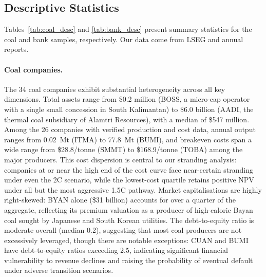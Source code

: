 \subsection{Descriptive Statistics}
\label{subsec:descriptive_stats}

Tables~\ref{tab:coal_desc} and \ref{tab:bank_desc} present summary statistics for the coal and bank samples, respectively. Our data come from LSEG and annual reports.




\paragraph{Coal companies.} The 34 coal companies exhibit substantial heterogeneity across all key dimensions. Total assets range from \$0.2 million (BOSS, a micro-cap operator with a single small concession in South Kalimantan) to \$6.0 billion (AADI, the thermal coal subsidiary of Alamtri Resources), with a median of \$547 million. Among the 26 companies with verified production and cost data, annual output ranges from 0.02~Mt (ITMA) to 77.8~Mt (BUMI), and breakeven costs span a wide range from \$28.8/tonne (SMMT) to \$168.9/tonne (TOBA) among the major producers. This cost dispersion is central to our stranding analysis: companies at or near the high end of the cost curve face near-certain stranding under even the 2\textdegree C scenario, while the lowest-cost quartile retains positive NPV under all but the most aggressive 1.5\textdegree C pathway. Market capitalisations are highly right-skewed: BYAN alone (\$31 billion) accounts for over a quarter of the aggregate, reflecting its premium valuation as a producer of high-calorie Bayan coal sought by Japanese and South Korean utilities. The debt-to-equity ratio is moderate overall (median 0.2), suggesting that most coal producers are not excessively leveraged, though there are notable exceptions: CUAN and BUMI have debt-to-equity ratios exceeding 2.5, indicating significant financial vulnerability to revenue declines and raising the probability of eventual default under adverse transition scenarios.

